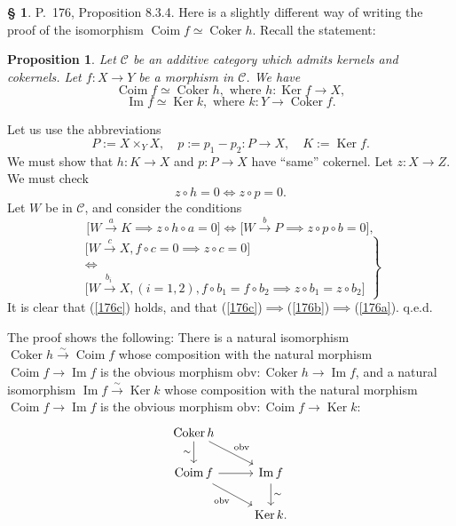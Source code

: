 \documentclass[12pt]{article}
\newtheorem{prop}[thm]{Proposition}
\theoremstyle{remark}
\theoremstyle{definition}
\newtheorem{cm}[thm]{\S}
\newcommand{\bc}{\begin{cm}}\newcommand{\ec}{\end{cm}}
\newcommand{\n}{\noindent}
\newcommand{\C}{\mathcal C}
\newcommand{\pf}{\n{\em Proof. }}
\newcommand{\bp}{\begin{prop}}
\newcommand{\ep}{\end{prop}}
\DeclareMathOperator{\Coim}{Coim}
\DeclareMathOperator{\Coker}{Coker}
\DeclareMathOperator{\Ima}{Im}
\DeclareMathOperator{\Ker}{Ker}
\begin{document}
\bc P.~176, Proposition 8.3.4. Here is a slightly different way of writing the proof of the isomorphism $\Coim f\simeq\Coker h$. Recall the statement: 
%
\bp 
Let $\C$ be an additive category which admits kernels and cokernels. Let $f:X\to Y$ be a morphism in $\C$. We have 
$$ 
\Coim f\simeq\Coker h,\text{ where }h:\Ker f\to X, 
$$ 
$$ 
\Ima f\simeq\Ker k,\text{ where }k:Y\to\Coker f.  
$$ 
\ep
% 
\pf Let us use the abbreviations 
$$
P:=X\times_YX,\quad p:=p_1-p_2:P\to X,\quad K:=\Ker f.
$$
We must show that $h:K\to X$ and $p:P\to X$ have ``same'' cokernel. Let $z:X\to Z$. We must check 
%
\begin{equation}\label{176a}
z\circ h=0\iff z\circ p=0.
\end{equation}
%
Let $W$ be in $\C$, and consider the conditions 
%
\begin{equation}\label{176b}
\Big[W\overset{a}{\to}K\implies z\circ h\circ a=0\Big]\iff\Big[W\overset{b}{\to}P\implies z\circ p\circ b=0\Big],
\end{equation}
%
\begin{equation}\label{176c}
\left.
\begin{matrix}
\Big[W\overset{c}{\to}X,f\circ c=0\implies z\circ c=0\Big]\\ 
\iff\\ 
\Big[W\overset{b_i\ }{\to}X,(i=1,2),f\circ b_1=f\circ b_2\implies z\circ b_1=z\circ b_2\Big]
\end{matrix}
\right\}
\end{equation}
It is clear that (\ref{176c}) holds, and that (\ref{176c})$\implies$(\ref{176b})$\implies$(\ref{176a}). q.e.d. 

The proof shows the following: There is a natural isomorphism $\Coker h\xrightarrow{\sim}\Coim f$ whose composition with the natural morphism $\Coim f\to\Ima f$ is the obvious morphism $\text{obv}:\Coker h\to\Ima f$, and a natural isomorphism $\Ima f\xrightarrow{\sim}\Ker k$ whose composition with the natural morphism $\Coim f\to\Ima f$ is the obvious morphism $\text{obv}:\Coim f\to\Ker k$: 
$$
\begin{tikzcd}
\Coker h\ar{d}[swap]{\sim}\ar{dr}{\text{obv}}\\
\Coim f\ar{r}\ar{dr}[swap]{\text{obv}}&\Ima f\ar{d}{\sim}\\
&\Ker k.
\end{tikzcd}
$$
\ec 

\end{document}
